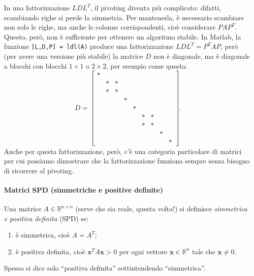 \documentclass[a4paper]{report}
\theoremstyle{definiton}
\theoremstyle{remark}
\begin{document}
In una fattorizzazione $LDL^T$, il pivoting diventa più complicato: difatti, scambiando righe si perde la simmetria. Per mantenerla, è necessario scambiare non solo le righe, ma anche le colonne corrispondenti, cioè considerare $PAP^T$. Questo, però, non è sufficiente per ottenere un algoritmo stabile.
In Matlab, la funzione \lstinline{[L,D,P] = ldl(A)} produce una fattorizzazione $LDL^T = P^TAP$, però (per avere una versione più stabile) la matrice $D$ non è diagonale, ma è diagonale a blocchi con blocchi $1\times 1$ o $2\times 2$, per esempio come questa:
\[
    D = \begin{bmatrix}
        *\\
        & * & *\\
        & * & *\\
        & & & *\\
        && & & *\\
        & & & & & * & *\\
        & & & & & * & *\\
        & & & & & & & *\\
        & & & & & & & &*
    \end{bmatrix}.
\]
Anche per questa fattorizzazione, però, c'è una categoria particolare di matrici per cui possiamo dimostrare che la fattorizzazione funziona sempre senza bisogno di ricorrere al pivoting.

\paragraph{Matrici SPD (simmetriche e positive definite)}

Una matrice $A\in\mathbb{R}^{n\times n}$ (serve che sia reale, questa volta!) si definisce \emph{simmetrica e positiva definita} (SPD) se:
\begin{enumerate}
    \item è simmetrica, cioè $A=A^T$;
    \item è positiva definita, cioè $\mathbf{x}^TA\mathbf{x} > 0$ per ogni vettore $\mathbf{x}\in \mathbb{R}^n$ tale che $\mathbf{x}\neq 0$.
\end{enumerate}
Spesso si dice solo ``positiva definita'' sottintendendo ``simmetrica''.
\end{document}

